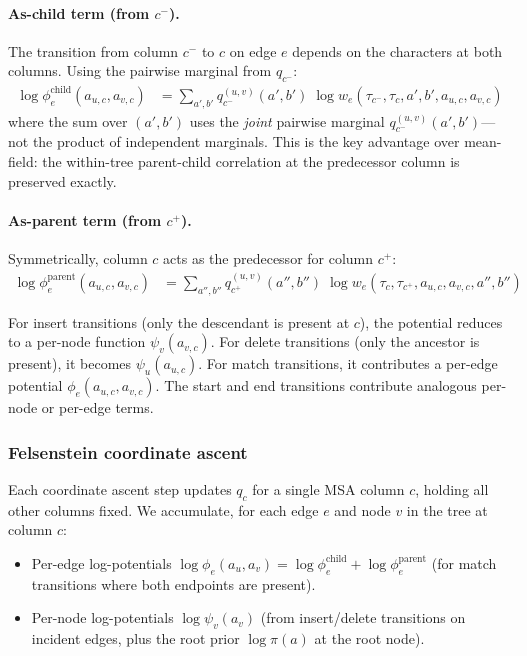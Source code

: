 \paragraph{As-child term (from $c^-$).}
The transition from column $c^-$ to $c$ on edge $e$ depends on the
characters at both columns. Using the pairwise marginal from $q_{c^-}$:
\begin{align}
\log \phi_e^{\mathrm{child}}(a_{u,c}, a_{v,c})
 &= \sum_{a', b'} q_{c^-}^{(u,v)}(a', b')\;
    \log w_e(\tau_{c^-\!}, \tau_c, a', b', a_{u,c}, a_{v,c})
\label{eq:pot-child}
\end{align}
where the sum over $(a', b')$ uses the \emph{joint} pairwise marginal
$q_{c^-}^{(u,v)}(a', b')$---not the product of independent marginals.
This is the key advantage over mean-field:
the within-tree parent-child correlation at the predecessor column is
preserved exactly.

\paragraph{As-parent term (from $c^+$).}
Symmetrically, column $c$ acts as the predecessor for column $c^+$:
\begin{align}
\log \phi_e^{\mathrm{parent}}(a_{u,c}, a_{v,c})
 &= \sum_{a'', b''} q_{c^+}^{(u,v)}(a'', b'')\;
    \log w_e(\tau_c, \tau_{c^+\!}, a_{u,c}, a_{v,c}, a'', b'')
\label{eq:pot-parent}
\end{align}

For insert transitions (only the descendant is present at $c$),
the potential reduces to a per-node function $\psi_v(a_{v,c})$.
For delete transitions (only the ancestor is present), it becomes $\psi_u(a_{u,c})$.
For match transitions, it contributes a per-edge potential $\phi_e(a_{u,c}, a_{v,c})$.
The start and end transitions contribute analogous per-node or per-edge terms.

\subsubsection{Felsenstein coordinate ascent}
\label{sec:felsenstein-update}

Each coordinate ascent step updates $q_c$ for a single MSA column $c$,
holding all other columns fixed.
We accumulate, for each edge $e$ and node $v$ in the tree at column $c$:
\begin{itemize}
\item Per-edge log-potentials
  $\log \phi_e(a_u, a_v) = \log \phi_e^{\mathrm{child}} + \log \phi_e^{\mathrm{parent}}$
  (for match transitions where both endpoints are present).
\item Per-node log-potentials
  $\log \psi_v(a_v)$ (from insert/delete transitions on incident edges,
  plus the root prior $\log \pi(a)$ at the root node).
\end{itemize}


